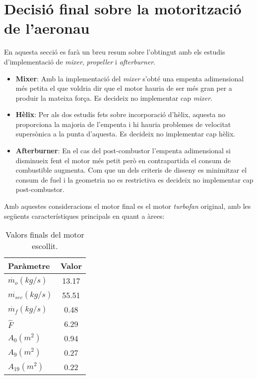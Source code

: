 \section{Decisió final sobre la motorització de l'aeronau}
En aquesta secció es farà un breu resum sobre l'obtingut amb els estudis d'implementació de \textit{mixer}, \textit{propeller} i \textit{afterburner}.
\begin{itemize}
\item \textbf{Mixer}: Amb la implementació del \textit{mixer} s'obté una empenta adimensional més petita el que voldria dir que el motor hauria de ser més gran per a produir la mateixa força. Es decideix no implementar cap \textit{mixer}.
\item \textbf{Hèlix}: Per als dos estudis fets sobre incorporació d'hèlix, aquesta no proporciona la majoria de l'empenta i hi hauria problemes de velocitat supersònica a la punta d'aquesta. Es decideix no implementar cap hèlix.
\item \textbf{Afterburner}: En el cas del post-combustor l'empenta adimensional si disminueix fent el motor més petit però en contrapartida el consum de combustible augmenta. Com que un dels criteris de disseny es minimitzar el consum de fuel i la geometria no es restrictiva es decideix no implementar cap post-combustor.  
\end{itemize}
Amb aquestes consideracions el motor final es el motor \textit{turbofan} original, amb les següents característiques principals en quant a àrees:

\begin{table}[H]
	\centering
	\begin{tabular}{lc}
		\toprule[3pt]
		\textbf{Paràmetre}&\textbf{Valor}\\
		\midrule[1pt]
		$\dot{m_{o}}(kg/s)$ & 13.17 \\
		$\dot{m_{sec}}(kg/s)$ & 55.51 \\
		$\dot{m_{f}}(kg/s)$ & 0.48 \\
		$\hat{F}$&6.29\\
		$A_0 (m^2)$&0.94\\
		$A_9(m^2)$ &0.27\\
		$A_{19}(m^2)$&0.22\\
		\bottomrule[2pt]
	\end{tabular}
	\caption{Valors finals del motor escollit.}
\end{table}